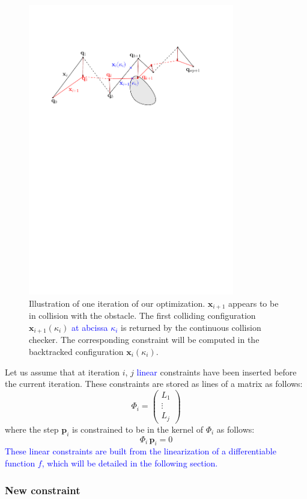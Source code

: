 \documentclass{tADR2e}
\newcommand\p{\mathbf{p}}
\newcommand\xx{\mathbf{x}} %
\newcommand\tcolli{\kappa_i}
\newcommand\Jf{\Phi}
\begin{document}
\begin{figure}
	\centering
	\includegraphics[width=9cm]{optim_grad.pdf}
	\caption{Illustration of one iteration of our optimization.
	$\xx_{i+1}$ appears 
	to be in collision with the obstacle. The first colliding configuration 
	$\xx_{i+1}(\tcolli)$ \textcolor{blue}{at abcissa $\tcolli$} is returned by 
	the continuous collision checker. The 
	corresponding constraint will be computed in the backtracked configuration 
	$\xx_{i}(\tcolli)$.}
	\label{optim_grad}
\end{figure}

Let us assume that at iteration $i$, $j$ \textcolor{blue}{linear} constraints have been inserted before the current iteration. 
These constraints are stored as lines of a matrix as follows:
$$
\Jf_{i} = \left(\begin{array}{c}L_1 \\ \vdots \\ L_j\end{array}\right)
$$
where the step $\p_i$ is constrained to be in the kernel of $\Jf_{i}$ as follows:
$$
\Jf_{i} \, \p_i = 0
$$
\textcolor{blue}{These linear constraints are built from the linearization of a differentiable function $f$, which will be detailed in the following section.}

\subsubsection{New constraint}\label{subsubsec:new-constraint}
\end{document}
